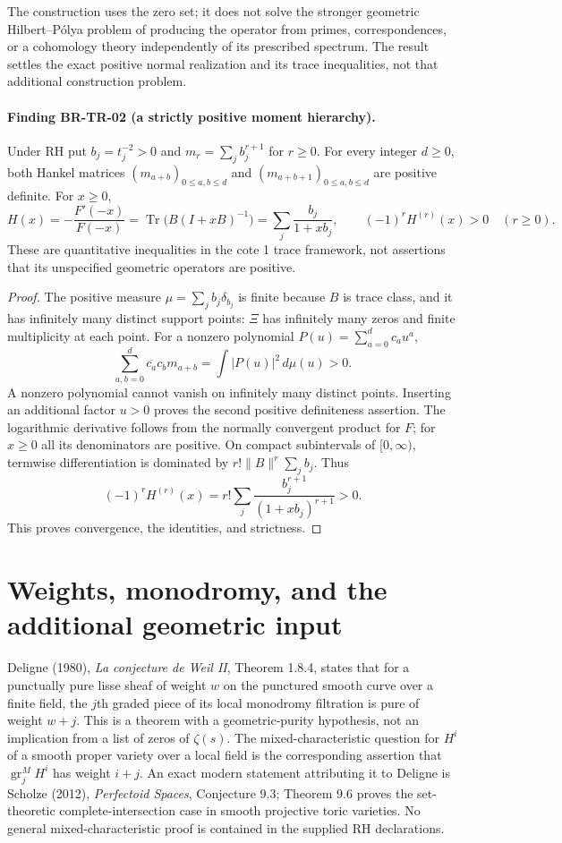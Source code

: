 The construction uses the zero set; it does not solve the stronger
geometric Hilbert--P\'olya problem of producing the operator from
primes, correspondences, or a cohomology theory independently of its
prescribed spectrum.  The result settles the exact positive normal
realization and its trace inequalities, not that additional
construction problem.

\paragraph{Finding BR-TR-02 (a strictly positive moment hierarchy).}
Under RH put $b_j=t_j^{-2}>0$ and
$m_r=\sum_j b_j^{r+1}$ for $r\geq0$.  For every integer $d\geq0$,
both Hankel matrices $(m_{a+b})_{0\leq a,b\leq d}$ and
$(m_{a+b+1})_{0\leq a,b\leq d}$ are positive definite.
For $x\geq0$,
\[
 H(x)=-\frac{F'(-x)}{F(-x)}
      =\operatorname{Tr}\bigl(B(I+xB)^{-1}\bigr)
      =\sum_j\frac{b_j}{1+xb_j},
 \qquad (-1)^r H^{(r)}(x)>0\quad(r\geq0).
\]
These are quantitative inequalities in the cote 1 trace framework,
not assertions that its unspecified geometric operators are positive.

\begin{proof}
The positive measure $\mu=\sum_jb_j\delta_{b_j}$ is finite because
$B$ is trace class, and it has infinitely many distinct support points:
$\Xi$ has infinitely many zeros and finite multiplicity at each point.
For a nonzero polynomial $P(u)=\sum_{a=0}^d c_au^a$,
\[
 \sum_{a,b=0}^d\overline{c_a}c_bm_{a+b}
   =\int |P(u)|^2\,d\mu(u)>0.
\]
A nonzero polynomial cannot vanish on infinitely many distinct points.
Inserting an additional factor $u>0$ proves the second positive
definiteness assertion.  The logarithmic derivative follows from
the normally convergent product for $F$; for $x\geq0$ all its
denominators are positive.  On compact subintervals of $[0,\infty)$,
termwise differentiation is dominated by
$r!\|B\|^r\sum_jb_j$.  Thus
\[
 (-1)^rH^{(r)}(x)
 =r!\sum_j\frac{b_j^{r+1}}{(1+xb_j)^{r+1}}>0.
\]
This proves convergence, the identities, and strictness.
\end{proof}

\section{Weights, monodromy, and the additional geometric input}
\label{sec:root-weights}

Deligne (1980), \emph{La conjecture de Weil II}, Theorem 1.8.4,
states that for a punctually pure lisse sheaf of weight $w$ on the
punctured smooth curve over a finite field, the $j$th graded piece
of its local monodromy filtration is pure of weight $w+j$.
This is a theorem with a geometric-purity hypothesis, not an
implication from a list of zeros of $\zeta(s)$.
The mixed-characteristic question for $H^i$ of a smooth proper
variety over a local field is the corresponding assertion that
$\operatorname{gr}_j^M H^i$ has weight $i+j$.
An exact modern statement attributing it to Deligne is Scholze (2012),
\emph{Perfectoid Spaces}, Conjecture 9.3; Theorem 9.6 proves the
set-theoretic complete-intersection case in smooth projective toric
varieties.  No general mixed-characteristic proof is contained in
the supplied RH declarations.

